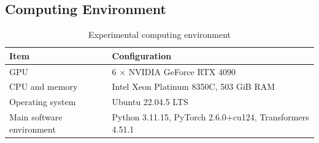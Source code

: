 \documentclass[a4paper,12pt]{article}
\numberwithin{table}{section}
\begin{document}
\subsection{Computing Environment}

\begin{table}[htbp]
\centering
\small
\caption{Experimental computing environment}
\label{tab:appendix-experiment-environment}
\begin{tabular}{ll}
\toprule
\textbf{Item} & \textbf{Configuration} \\
\midrule
GPU & 6 $\times$ NVIDIA GeForce RTX 4090 \\
CPU and memory & Intel Xeon Platinum 8350C, 503 GiB RAM \\
Operating system & Ubuntu 22.04.5 LTS \\
Main software environment & Python 3.11.15, PyTorch 2.6.0+cu124, Transformers 4.51.1 \\
\bottomrule
\end{tabular}
\end{table}
\end{document}
